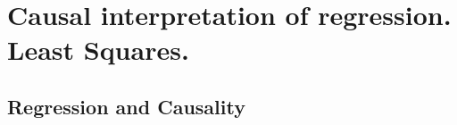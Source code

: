 \documentclass[DIV=14,titlepage=false]{scrreprt}
\begin{document}
\vspace{-10pt}
\setcounter{chapter}{1}

\chapter{Causal interpretation of regression. Least Squares.}
\section{Regression and Causality}
\end{document}
